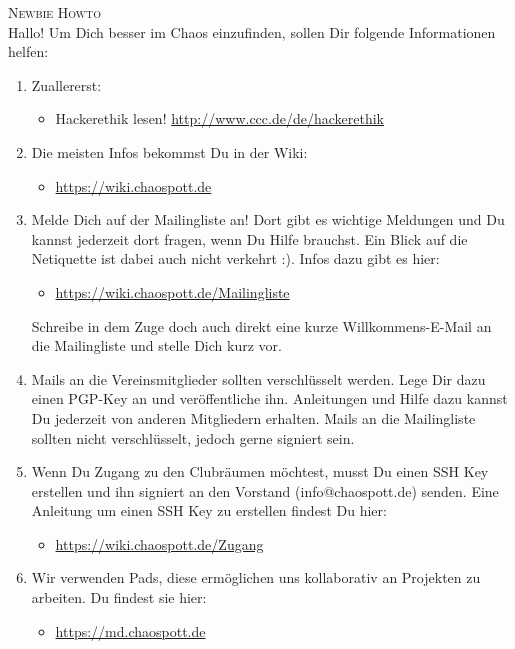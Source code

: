 
\pagestyle{empty}

	\textsc{\huge Newbie Howto}\\[0.5cm]
	Hallo!
	\newline
	Um Dich besser im Chaos einzufinden, sollen Dir folgende Informationen helfen:
	\begin{enumerate}
	\item Zuallererst:
		\begin{itemize}
		  \item Hackerethik lesen! \url{http://www.ccc.de/de/hackerethik}
		\end{itemize}
	\item Die meisten Infos bekommst Du in der Wiki: 
		\begin{itemize}
		  \item \url{https://wiki.chaospott.de}
		\end{itemize}
	\item Melde Dich auf der Mailingliste an! Dort gibt es wichtige Meldungen und Du kannst jederzeit dort fragen, wenn Du Hilfe brauchst. Ein Blick auf die Netiquette ist dabei auch nicht verkehrt :). Infos dazu gibt es hier:
		\begin{itemize}
		  \item \url{https://wiki.chaospott.de/Mailingliste}
		\end{itemize}
		Schreibe in dem Zuge doch auch direkt eine kurze Willkommens-E-Mail an die Mailingliste und stelle Dich kurz vor.
	\item Mails an die Vereinsmitglieder sollten verschlüsselt werden. Lege Dir dazu einen PGP-Key an und veröffentliche ihn. Anleitungen und Hilfe dazu kannst Du jederzeit von anderen Mitgliedern erhalten. Mails an die Mailingliste sollten nicht verschlüsselt, jedoch gerne signiert sein.
	\item Wenn Du Zugang zu den Clubräumen möchtest, musst Du einen SSH Key erstellen und ihn signiert an den Vorstand (info@chaospott.de) senden. Eine Anleitung um einen SSH Key zu erstellen findest Du hier: 
		\begin{itemize}
		  \item \url{https://wiki.chaospott.de/Zugang}
		\end{itemize}
	\item Wir verwenden Pads, diese ermöglichen uns kollaborativ an Projekten zu arbeiten. Du findest sie hier:
		\begin{itemize}
		  \item \url{https://md.chaospott.de}
		\end{itemize}

\end{enumerate}
